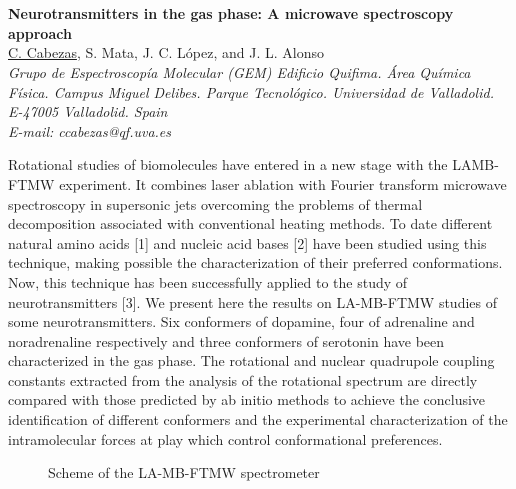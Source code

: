 \section*{}
\begin{center}
{\bf \Large
Neurotransmitters in the gas phase: A microwave spectroscopy approach
}
\\
\vspace{0.5cm}
\underline{C. Cabezas}, S. Mata, J. C. López, and J. L. Alonso
\\
\vspace{0.5cm}
{\it 
Grupo de Espectroscopía Molecular (GEM) Edificio Quifima. Área Química Física.
Campus Miguel Delibes. Parque Tecnológico. Universidad de Valladolid. E-47005 Valladolid. Spain
}
\\
\vspace{0.5cm}
{\it E-mail: ccabezas@qf.uva.es}
\\
\vspace{0.5cm}
\end{center}
Rotational studies of biomolecules have entered in a new stage with the LAMB-FTMW experiment.
It combines laser ablation with Fourier transform
microwave spectroscopy in supersonic jets overcoming the problems of thermal
decomposition associated with conventional heating methods. To date different
natural amino acids [1] and nucleic acid bases [2] have been studied using this
technique, making possible the characterization of their preferred conformations.
Now, this technique has been successfully applied to the study of neurotransmitters
[3]. We present here the results on LA-MB-FTMW studies of some
neurotransmitters. Six conformers of dopamine, four of adrenaline and noradrenaline
respectively and three conformers of serotonin have been characterized in the gas
phase. The rotational and nuclear quadrupole coupling constants extracted from the
analysis of the rotational spectrum are directly compared with those predicted by ab
initio methods to achieve the conclusive identification of different conformers and
the experimental characterization of the intramolecular forces at play which control
conformational preferences.
\\
\begin{figure}[h]
 \centerline{}
 \caption[]{Scheme of the LA-MB-FTMW spectrometer}\label{figure 1}
\end{figure}
